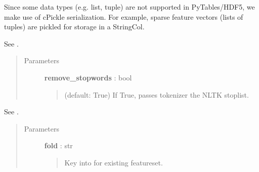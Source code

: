 \documentclass[letterpaper,10pt,english]{sphinxmanual}
\begin{document}
\begin{fulllineitems}
\begin{itemize}
\begin{itemize}
\begin{itemize}
\begin{description}
\end{description}

\end{itemize}

\end{itemize}

\end{itemize}

Since some data types (e.g. list, tuple) are not supported in PyTables/HDF5,
we make use of cPickle serialization. For example, sparse feature vectors
(lists of tuples) are pickled for storage in a StringCol.

\begin{fulllineitems}
\label{tethne.persistence.hdf5.corpus:tethne.persistence.hdf5.corpus.HDF5Corpus.abstract_to_features}
See .
\begin{quote}\begin{description}
\item[{Parameters}] \leavevmode
\textbf{remove\_stopwords} : bool
\begin{quote}

(default: True) If True, passes tokenizer the NLTK stoplist.
\end{quote}

\end{description}\end{quote}

\end{fulllineitems}


\begin{fulllineitems}
\label{tethne.persistence.hdf5.corpus:tethne.persistence.hdf5.corpus.HDF5Corpus.filter_features}
See .
\begin{quote}\begin{description}
\item[{Parameters}] \leavevmode
\textbf{fold} : str
\begin{quote}

Key into  for existing featureset.
\end{quote}


\end{description}
\end{quote}
\end{fulllineitems}
\end{fulllineitems}
\end{document}

